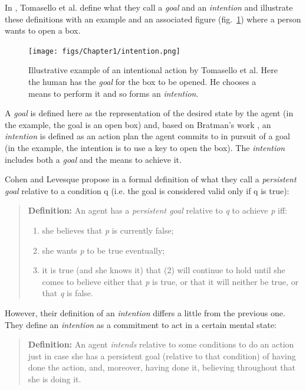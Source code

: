 \documentclass[english,a4paper,11pt,twoside]{StyleThese}
\begin{document}
In \cite{tomasello2005understanding}, Tomasello et al. define what they call a \textit{goal} and an \textit{intention} and illustrate these definitions with an example and an associated figure (fig.~\ref{fig:intention}) where a person wants to open a box.

\begin{figure}[!h]
	\centering
    \texttt{[image: figs/Chapter1/intention.png]}
    \caption{Illustrative example of an intentional action by Tomasello et al. Here the human has the \textit{goal} for the box to be opened. He chooses a means to perform it and so forms an \textit{intention}.}
    \label{fig:intention}
\end{figure}
A \textit{goal} is defined here as the representation of the desired state by the agent (in the example, the goal is an open box) and, based on Bratman's work \cite{bratman1989intention}, an \textit{intention} is defined as an action plan the agent commits to in pursuit of a goal (in the example, the intention is to use a key to open the box). The \textit{intention} includes both a \textit{goal} and the means to achieve it.

Cohen and Levesque propose in \cite{cohen1991teamwork} a formal definition of what they call a \textit{persistent goal} relative to a condition q (i.e. the goal is considered valid only if q is true):

\begin{quote}
\textbf{Definition: } An agent has a \textit{persistent goal} relative to \textit{q} to achieve \textit{p} iff:
\begin{enumerate}
\item she believes that \textit{p} is currently false;
\item she wants \textit{p} to be true eventually;
\item it is true (and she knows it) that (2) will continue to hold until she comes to believe either that \textit{p} is true, or that it will neither be true, or that \textit{q} is false.
\end{enumerate}
\end{quote}

However, their definition of an \textit{intention} differs a little from the previous one. They define an \textit{intention} as a commitment to act in a certain mental state:

\begin{quote}
\textbf{Definition:} An agent \textit{intends} relative to some conditions to do an action just in case she has a persistent goal (relative to that condition) of having done the action, and, moreover, having done it, believing throughout that she is doing it.
\end{quote}
\end{document}

